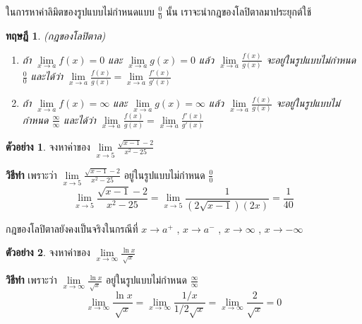 \documentclass[
]{book}
\newtheorem{theorem}{ทฤษฎี}[chapter]
\theoremstyle{definition}
\theoremstyle{definition}
\newtheorem{example}{ตัวอย่าง}[chapter]
\theoremstyle{definition}
\theoremstyle{definition}
\theoremstyle{remark}
\begin{document}
ในการหาค่าลิมิตของรูปแบบไม่กำหนดแบบ \(\displaystyle \frac{0}{0}\) นั้น
เราจะนำกฎของโลปิตาลมาประยุกต์ใช้

\begin{theorem}

(กฎของโลปิตาล)\\

\begin{enumerate}
\def\labelenumi{\arabic{enumi}.}
\item
  ถ้า \(\mathop {\lim }\limits_{x\to a} f(x)=0\) และ \(\mathop {\lim
      }\limits_{x\to a} g(x)=0\) แล้ว
  \(\displaystyle \mathop {\lim }\limits_{x\to
      a}
      \frac{f(x)}{g(x)}\) จะอยู่ในรูปแบบไม่กำหนด
  \(\displaystyle \frac{0}{0}\) และได้ว่า
  \(\displaystyle \mathop {\lim }\limits_{x\to a}
      \frac{f(x)}{g(x)}=\mathop {\lim
      }\limits_{x\to a} \frac{{f}'(x)}{{g}'(x)}\)\\
\item
  ถ้า \(\mathop {\lim }\limits_{x\to a} f(x)=\infty\) และ \(\mathop {\lim
      }\limits_{x\to a} g(x)=\infty\) แล้ว \(\displaystyle \mathop {\lim
      }\limits_{x\to a}
      \frac{f(x)}{g(x)}\) จะอยู่ในรูปแบบไม่กำหนด
  \(\displaystyle \frac{\infty
      }{\infty }\) และได้ว่า
  \(\displaystyle \mathop {\lim }\limits_{x\to a}
      \frac{f(x)}{g(x)}=\mathop {\lim
      }\limits_{x\to a} \frac{{f}'(x)}{{g}'(x)}\)
\end{enumerate}

\end{theorem}

\begin{example}
จงหาค่าของ \(\displaystyle \mathop {\lim }\limits_{x\to 5} \frac{\sqrt
{x-1}
-2}{x^2-25}\)
\end{example}

\textbf{วิธีทำ} เพราะว่า
\(\displaystyle \mathop {\lim }\limits_{x\to 5} \frac{\sqrt
{x-1}
-2}{x^2-25}\) อยู่ในรูปแบบไม่กำหนด \(\displaystyle \frac{0}{0}\)
\[\displaystyle \mathop {\lim }\limits_{x\to 5} \frac{\sqrt {x-1} 
-2}{x^2-25}=\mathop {\lim 
}\limits_{x\to 5} \frac{1}{(2\sqrt {x-1} )(2x)}=\frac{1}{40}\]

กฎของโลปิตาลยังคงเป็นจริงในกรณีที่ \(x\to a^+\) , \(x\to a^-\) , \(x\to \infty\) ,
\(x\to -\infty\)

\begin{example}
จงหาค่าของ
\(\displaystyle \mathop {\lim }\limits_{x\to \infty } \frac{\ln
x}{\sqrt x }\)
\end{example}

\textbf{วิธีทำ} เพราะว่า
\(\displaystyle \mathop {\lim }\limits_{x\to \infty } \frac{\ln
x}{\sqrt x
}\) อยู่ในรูปแบบไม่กำหนด \(\displaystyle \frac{\infty }{\infty }\)
\[\displaystyle \mathop {\lim }\limits_{x\to \infty } \frac{\ln x}{\sqrt x 
}=\mathop {\lim 
}\limits_{x\to \infty } \frac{1/x}{1/2\sqrt x }=\mathop {\lim }\limits_{x\to 
\infty } \frac{2}{\sqrt x }=0\]
\end{document}

